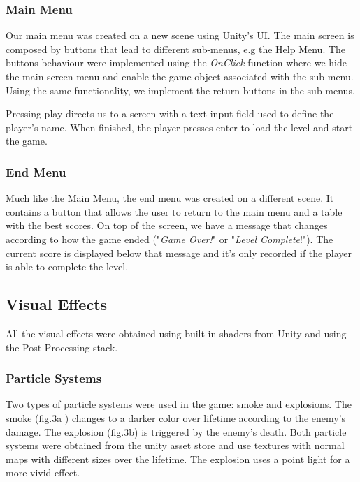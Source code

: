 \documentclass[a4paper]{article}
\begin{document}
  	\subsubsection{Main Menu}
    Our main menu was created on a new scene using Unity's UI. The main screen is composed by buttons that lead to different sub-menus, e.g the Help Menu. The buttons behaviour were implemented using the \textit{OnClick} function where we hide the main screen menu and enable the game object associated with the sub-menu. Using the same functionality, we implement the return buttons in the sub-menus.
   
   Pressing play directs us to a screen with a text input field used to define the player's name. When finished, the player presses enter to load the level and start the game. 
    
  	\subsubsection{End Menu}
    Much like the Main Menu, the end menu was created on a different scene. It contains a button that allows the user to return to the main menu and a table with the best scores.
    On top of the screen, we have a message that changes according to how the game ended ("\textit{Game Over!}" or "\textit{Level Complete}!"). The current score is displayed below that message and it's only recorded if the player is able to complete the level.
    
    
\subsection{Visual Effects}
	
    All the visual effects were obtained using built-in shaders from Unity and using the Post Processing stack.

	\subsubsection{Particle Systems}
    
    Two types of particle systems were used in the game: smoke and explosions. The smoke (fig.3a ) changes to a darker color over lifetime according to the enemy's damage. The explosion (fig.3b) is triggered by the enemy's death. Both particle systems were obtained from the unity asset store and use textures with normal maps with different sizes over the lifetime. The explosion uses a point light for a more vivid effect.
    
\end{document}
